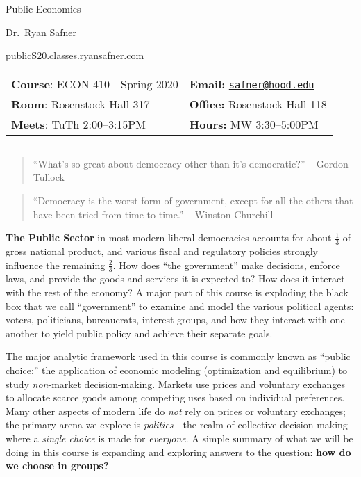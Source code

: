 \documentclass{article}
\begin{document}
\sffamily

\centerline{\Huge Public Economics}

\vspace{3 mm}

\centerline{\large Dr.~Ryan Safner}
\vspace{2 mm}
\centerline{\large \href{http://publicS20.classes.ryansafner.com}{publicS20.classes.ryansafner.com}}

\vspace{5 mm}

\begin{tabular}{@{}p{3.5in}p{3.5in}}           
\textbf{Course}: ECON 410 - Spring 2020  & \textbf{Email:}  \href{mailto:safner@hood.edu}{\nolinkurl{safner@hood.edu}}\\
\textbf{Room}: Rosenstock Hall 317 & \textbf{Office:}  Rosenstock Hall 118\\
\textbf{Meets}: TuTh 2:00--3:15PM & \textbf{Hours:} MW 3:30--5:00PM\\ 
\end{tabular}

\vspace{5 mm}

\hrule


\begin{quote}
``What's so great about democracy other than it's democratic?'' --
Gordon Tullock
\end{quote}

\begin{quote}
``Democracy is the worst form of government, except for all the others
that have been tried from time to time.'' -- Winston Churchill
\end{quote}

\textbf{The Public Sector} in most modern liberal democracies accounts
for about \(\frac{1}{3}\) of gross national product, and various fiscal
and regulatory policies strongly influence the remaining
\(\frac{2}{3}\). How does ``the government'' make decisions, enforce
laws, and provide the goods and services it is expected to? How does it
interact with the rest of the economy? A major part of this course is
exploding the black box that we call ``government'' to examine and model
the various political agents: voters, politicians, bureaucrats, interest
groups, and how they interact with one another to yield public policy
and achieve their separate goals.

The major analytic framework used in this course is commonly known as
``public choice:'' the application of economic modeling (optimization
and equilibrium) to study \emph{non}-market decision-making. Markets use
prices and voluntary exchanges to allocate scarce goods among competing
uses based on individual preferences. Many other aspects of modern life
do \emph{not} rely on prices or voluntary exchanges; the primary arena
we explore is \emph{politics}---the realm of collective decision-making
where a \emph{single choice} is made for \emph{everyone}. A simple
summary of what we will be doing in this course is expanding and
exploring answers to the question: \textbf{how do we choose in groups?}
\end{document}
